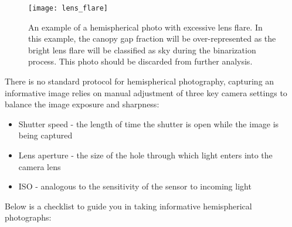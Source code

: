 \documentclass{article}
\begin{document}
\begin{figure}[H]
\centering
	\texttt{[image: lens\_flare]}
	\caption{An example of a hemispherical photo with excessive lens flare. In this example, the canopy gap fraction will be over-represented as the bright lens flare will be classified as sky during the binarization process. This photo should be discarded from further analysis.}
	\label{lens_flare}
\end{figure}

There is no standard protocol for hemispherical photography, capturing an informative image relies on manual adjustment of three key camera settings to balance the image exposure and sharpness:

\begin{itemize}
	\item{Shutter speed - the length of time the shutter is open while the
		image is being captured}
	\item{Lens aperture - the size of the hole through which light enters into
		the camera lens}
	\item{ISO - analogous to the sensitivity of the sensor to incoming light}
\end{itemize}

Below is a checklist to guide you in taking informative hemispherical photographs: 
\end{document}
